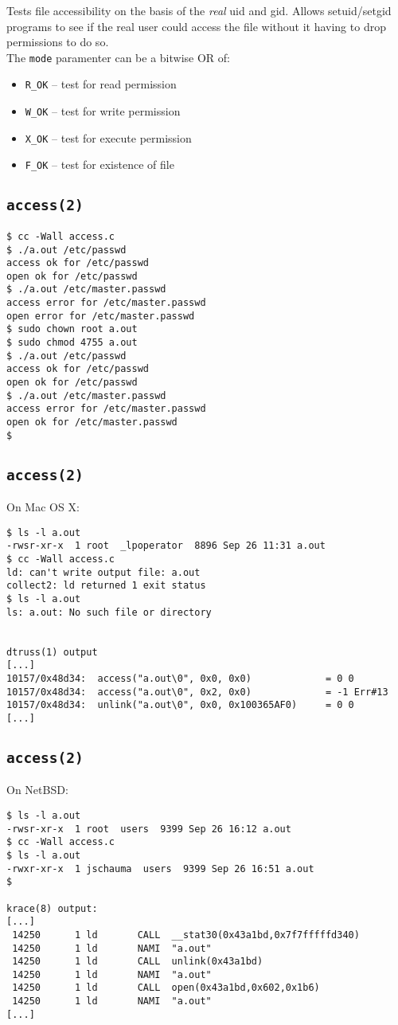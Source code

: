 \documentclass[xga]{xdvislides}
\begin{document}
Tests file accessibility on the basis of the {\em real} uid and gid. Allows
setuid/setgid programs to see if the real user could access the file without
it having to drop permissions to do so.
\\

The {\tt mode} paramenter can be a bitwise OR of:

\begin{itemize}
	\item {\tt R\_OK} -- test for read permission
	\item {\tt W\_OK} -- test for write permission
	\item {\tt X\_OK} -- test for execute permission
	\item {\tt F\_OK} -- test for existence of file
\end{itemize}

\subsection{{\tt access(2)}}
\begin{verbatim}
$ cc -Wall access.c
$ ./a.out /etc/passwd
access ok for /etc/passwd
open ok for /etc/passwd
$ ./a.out /etc/master.passwd
access error for /etc/master.passwd
open error for /etc/master.passwd
$ sudo chown root a.out
$ sudo chmod 4755 a.out
$ ./a.out /etc/passwd
access ok for /etc/passwd
open ok for /etc/passwd
$ ./a.out /etc/master.passwd
access error for /etc/master.passwd
open ok for /etc/master.passwd
$
\end{verbatim}

\subsection{{\tt access(2)}}
On Mac OS X:
\begin{verbatim}
$ ls -l a.out
-rwsr-xr-x  1 root  _lpoperator  8896 Sep 26 11:31 a.out
$ cc -Wall access.c
ld: can't write output file: a.out
collect2: ld returned 1 exit status
$ ls -l a.out
ls: a.out: No such file or directory


dtruss(1) output
[...]
10157/0x48d34:  access("a.out\0", 0x0, 0x0)             = 0 0
10157/0x48d34:  access("a.out\0", 0x2, 0x0)             = -1 Err#13
10157/0x48d34:  unlink("a.out\0", 0x0, 0x100365AF0)     = 0 0
[...]
\end{verbatim}


\subsection{{\tt access(2)}}
On NetBSD:
\begin{verbatim}
$ ls -l a.out
-rwsr-xr-x  1 root  users  9399 Sep 26 16:12 a.out
$ cc -Wall access.c
$ ls -l a.out
-rwxr-xr-x  1 jschauma  users  9399 Sep 26 16:51 a.out
$

krace(8) output:
[...]
 14250      1 ld       CALL  __stat30(0x43a1bd,0x7f7fffffd340)
 14250      1 ld       NAMI  "a.out"
 14250      1 ld       CALL  unlink(0x43a1bd)
 14250      1 ld       NAMI  "a.out"
 14250      1 ld       CALL  open(0x43a1bd,0x602,0x1b6)
 14250      1 ld       NAMI  "a.out"
[...]
\end{verbatim}
\end{document}

